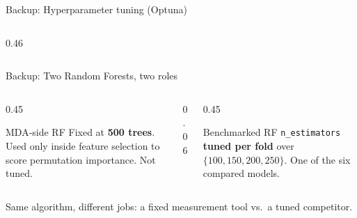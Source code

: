 \documentclass[aspectratio=169, t]{beamer}
\begin{document}
\begin{frame}{Backup: Hyperparameter tuning (Optuna)}
\begin{columns}[T]
\begin{column}{0.46\textwidth}
\end{column}
\end{columns}
\end{frame}


\begin{frame}{Backup: Two Random Forests, two roles}
\vspace{-0.4em}

\begin{columns}[T]
\begin{column}{0.45\textwidth}
{
\begin{block}{MDA-side RF}
\footnotesize
Fixed at \textbf{500 trees}. Used only inside feature selection to score permutation importance. Not tuned.
\end{block}
}
\end{column}
\begin{column}{0.06\textwidth}\hfill\end{column}
\begin{column}{0.45\textwidth}
{
\begin{block}{Benchmarked RF}
\footnotesize
\texttt{n\_estimators} \textbf{tuned per fold} over $\{100,150,200,250\}$. One of the six compared models.
\end{block}
}
\end{column}
\end{columns}

\vspace{1.5em}
\centering
{\footnotesize Same algorithm, different jobs: a fixed measurement tool vs.\ a tuned competitor.}
\end{frame}
\end{document}
